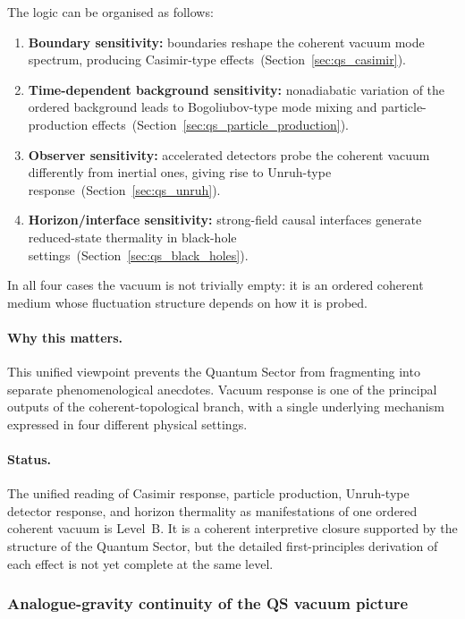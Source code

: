 \documentclass[11pt,a4paper]{article}
\numberwithin{equation}{section}
\begin{document}
The logic can be organised as follows:
\begin{enumerate}[label=(\roman*)]
  \item \textbf{Boundary sensitivity:}
    boundaries reshape the coherent vacuum mode spectrum, producing
    Casimir-type effects~(Section~\ref{sec:qs_casimir}).
  \item \textbf{Time-dependent background sensitivity:}
    nonadiabatic variation of the ordered background leads to
    Bogoliubov-type mode mixing and particle-production
    effects~(Section~\ref{sec:qs_particle_production}).
  \item \textbf{Observer sensitivity:}
    accelerated detectors probe the coherent vacuum differently
    from inertial ones, giving rise to Unruh-type
    response~(Section~\ref{sec:qs_unruh}).
  \item \textbf{Horizon/interface sensitivity:}
    strong-field causal interfaces generate reduced-state
    thermality in black-hole
    settings~(Section~\ref{sec:qs_black_holes}).
\end{enumerate}
In all four cases the vacuum is not trivially empty: it is an
ordered coherent medium whose fluctuation structure depends on
how it is probed.

\paragraph{Why this matters.}
This unified viewpoint prevents the Quantum Sector from fragmenting
into separate phenomenological anecdotes.
Vacuum response is one of the principal outputs of the
coherent-topological branch, with a single underlying mechanism
expressed in four different physical settings.

\paragraph{Status.}
The unified reading of Casimir response, particle production,
Unruh-type detector response, and horizon thermality as manifestations
of one ordered coherent vacuum is Level~B.
It is a coherent interpretive closure supported by the structure of
the Quantum Sector, but the detailed first-principles derivation of
each effect is not yet complete at the same level.

\subsubsection*{Analogue-gravity continuity of the QS vacuum picture}
\end{document}
